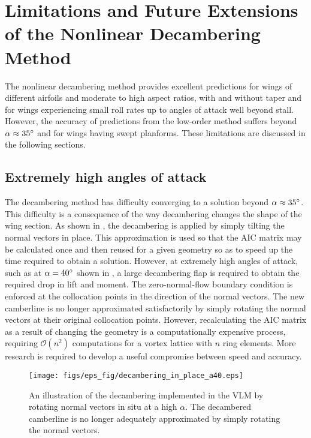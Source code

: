 \section{Limitations and Future Extensions of the Nonlinear Decambering Method}
\label{sec:limitations}
The nonlinear decambering method provides excellent predictions for wings of different airfoils and moderate to high aspect ratios, with and without taper and for wings experiencing small roll rates up to angles of attack well beyond stall. However, the accuracy of predictions from the low-order method suffers beyond $\alpha \approx 35^\circ{}$ and for wings having swept planforms. These limitations are discussed in the following sections.

\subsection{Extremely high angles of attack}
\newcommand{\bigO}{\ensuremath{\mathcal{O}}}
The decambering method has difficulty converging to a solution beyond $\alpha \approx 35^\circ{}$. This difficulty is a consequence of the way decambering changes the shape of the wing section. As shown in , the decambering is applied by simply tilting the normal vectors in place. This approximation is used so that the AIC matrix may be calculated once and then reused for a given geometry so as to speed up the time required to obtain a solution. However, at extremely high angles of attack, such as at $\alpha=40^\circ{}$ shown in , a large decambering flap is required to obtain the required drop in lift and moment. The zero-normal-flow boundary condition is enforced at the collocation points in the direction of the normal vectors. The new camberline is no longer approximated satisfactorily by simply rotating the normal vectors at their original collocation points. However, recalculating the AIC matrix as a result of changing the geometry is a computationally expensive process, requiring $\bigO(n^2)$ computations for a vortex lattice with $n$ ring elements. More research is required to develop a useful compromise between speed and accuracy.

\begin{figure}[!h]
    \centering
    \texttt{[image: figs/eps\_fig/decambering\_in\_place\_a40.eps]}
    \caption{An illustration of the decambering implemented in the VLM by rotating normal vectors in situ at a high $\alpha$. The decambered camberline is no longer adequately approximated by simply rotating the normal vectors.}
    \label{fig:decam-alpha40}
\end{figure}


